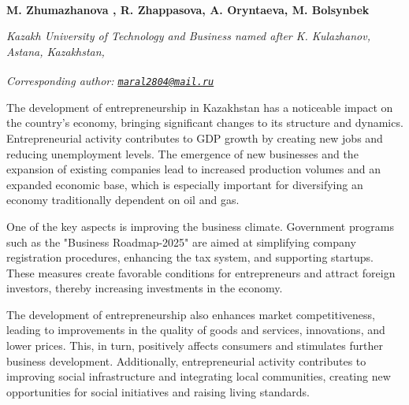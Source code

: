 
\begin{articleheader}

{\bfseries
M. Zhumazhanova\textsuperscript{\envelope } ,
R. Zhappasova,
A. Oryntaeva,
M. Bolsynbek}
\end{articleheader}

\begin{affiliation}
\emph{Kazakh University of Technology and Business named after K. Kulazhanov, Astana, Kazakhstan,}

\raggedright \textsuperscript{\envelope }{\em Corresponding author: \href{mailto:maral2804@mail.ru}{\nolinkurl{maral2804@mail.ru}}}
\end{affiliation}

The development of entrepreneurship in Kazakhstan has a noticeable
impact on the country's economy, bringing significant changes to its
structure and dynamics. Entrepreneurial activity contributes to GDP
growth by creating new jobs and reducing unemployment levels. The
emergence of new businesses and the expansion of existing companies lead
to increased production volumes and an expanded economic base, which is
especially important for diversifying an economy traditionally dependent
on oil and gas.

One of the key aspects is improving the business climate. Government
programs such as the "Business Roadmap-2025" are aimed at simplifying
company registration procedures, enhancing the tax system, and
supporting startups. These measures create favorable conditions for
entrepreneurs and attract foreign investors, thereby increasing
investments in the economy.

The development of entrepreneurship also enhances market
competitiveness, leading to improvements in the quality of goods and
services, innovations, and lower prices. This, in turn, positively
affects consumers and stimulates further business development.
Additionally, entrepreneurial activity contributes to improving social
infrastructure and integrating local communities, creating new
opportunities for social initiatives and raising living standards.

